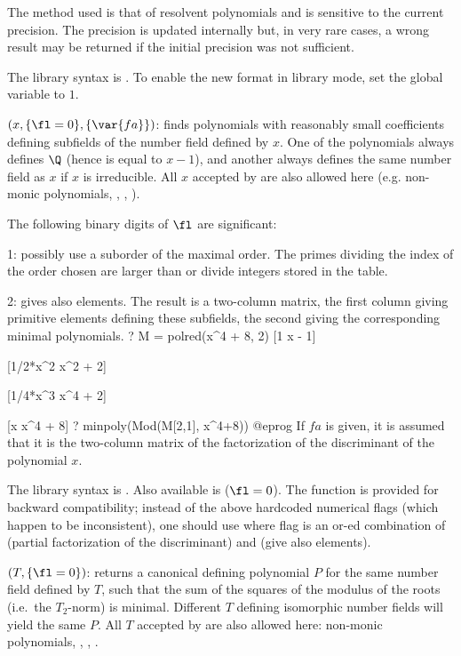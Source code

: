  The method used is that of resolvent polynomials and is
sensitive to the current precision. The precision is updated internally but,
in very rare cases, a wrong result may be returned if the initial precision
was not sufficient.

The library syntax is .
To enable the new format in library mode,
set the global variable  to $1$.

$(x,\{\fl=0\},\{\var{fa}\})$: \label{se:polred}finds polynomials with reasonably
small coefficients defining subfields of the number field defined by $x$.
One of the polynomials always defines $\Q$ (hence is equal to $x-1$),
and another always defines the same number field as $x$ if $x$ is irreducible.
All $x$ accepted by  are also allowed here (e.g. non-monic
polynomials, , , \kbd{[x,Z\_K\_basis]}).

The following binary digits of $\fl$ are significant:

1: possibly use a suborder of the maximal order. The primes dividing the
index of the order chosen are larger than  or divide integers
stored in the  table.

2: gives also elements. The result is a two-column matrix, the first column
giving primitive elements defining these subfields, the second giving the
corresponding minimal polynomials.
\bprog
? M = polred(x^4 + 8, 2)
[1 x - 1]

[1/2*x^2 x^2 + 2]

[1/4*x^3 x^4 + 2]

[x x^4 + 8]
? minpoly(Mod(M[2,1], x^4+8))
@eprog\noindent
If $fa$ is given, it is assumed that it is the two-column matrix of the
factorization of the discriminant of the polynomial $x$.

The library syntax is .
Also available is  ($\fl = 0$). The function
 is provided for backward compatibility; instead of the above
hardcoded numerical flags (which happen to be inconsistent), one should use
 where  flag  is  an or-ed
combination of  (partial factorization of the
discriminant) and  (give also elements).

$(T,\{\fl=0\})$: \label{se:polredabs}returns a canonical defining polynomial $P$ for the same number field
defined by $T$, such that the sum of the squares of the modulus of the
roots (i.e.~the $T_2$-norm) is minimal. Different $T$ defining isomorphic
number fields will yield the same $P$.
All $T$ accepted by  are also allowed here: non-monic
polynomials, , , \kbd{[T, Z\_K\_basis]}.

